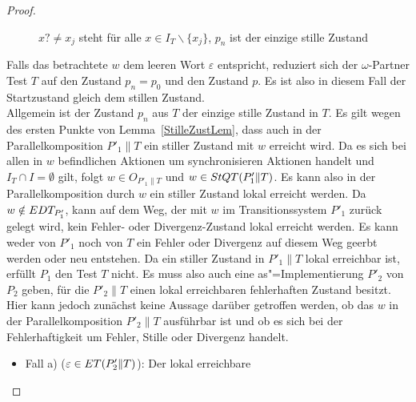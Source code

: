 \begin{proof}
\begin{figure} [h!tbp]
\begin{center}
    \caption{$x?\neq x_j$ steht für alle $x\in I_T\backslash\{x_j\}$, $p_n$
      ist der einzige stille Zustand}
    \label{TohneEmitIundO}
  \end{center}
  \end{figure}
  Falls das betrachtete $w$ dem leeren Wort $\varepsilon$ entspricht, reduziert
  sich der $\omega$-Partner Test $T$ auf den Zustand $p_n = p_0$ und den
  Zustand $p$. Es ist also in diesem Fall der Startzustand gleich dem stillen
  Zustand.\\
  Allgemein ist der Zustand $p_n$ aus $T$ der einzige stille Zustand in $T$. Es
  gilt wegen des ersten Punkte von Lemma~\ref{StilleZustLem}, dass auch in der
  Parallelkomposition $P'_1\|T$ ein stiller Zustand mit $w$ erreicht wird. Da
  es sich bei allen in $w$ befindlichen Aktionen um synchronisieren Aktionen
  handelt und $I_T\cap I=\emptyset$ gilt, folgt $w\in O_{P'_1\|T}$ und $w\in
  StQT (P'_1\|T)$. Es kann also in der Parallelkomposition durch $w$ ein
  stiller Zustand lokal erreicht werden. Da $w\notin EDT _{P'_1}$, kann auf dem
  Weg, der mit $w$ im Transitionssystem $P'_1$ zurück gelegt wird, kein Fehler-
  oder Divergenz-Zustand lokal erreicht werden. Es kann weder von $P'_1$
  noch von $T$ ein Fehler oder Divergenz auf diesem Weg geerbt werden oder neu
  entstehen. Da ein stiller Zustand in $P'_1\|T$ lokal erreichbar ist, erfüllt
  $P_1$ den Test $T$ nicht. Es muss also auch eine as"=Implementierung $P'_2$
  von $P_2$ geben, für die $P'_2\|T$ einen lokal erreichbaren fehlerhaften
  Zustand besitzt. Hier kann jedoch zunächst keine Aussage darüber getroffen
  werden, ob das $w$ in der Parallelkomposition $P'_2\|T$ ausführbar ist und ob
  es sich bei der Fehlerhaftigkeit um Fehler, Stille oder Divergenz handelt.
  \begin{itemize}
    \item Fall a) ($\varepsilon \in ET (P'_2\|T)$): Der lokal erreichbare

\end{itemize}
\end{proof}
